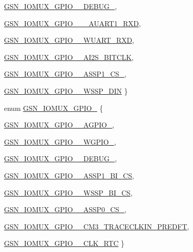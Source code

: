 \begin{DoxyCompactItemize}
\hyperlink{a00519_ad2c6d559f4b898b37fd1858edd2febb1a662e4efe97d2d17301dbd62a2b5828d6}{GSN\_\-IOMUX\_\-GPIO\_\_\-DEBUG\_}, 
\par
\hyperlink{a00519_ad2c6d559f4b898b37fd1858edd2febb1a47ed70f16651dbe92ea2860ed9e83538}{GSN\_\-IOMUX\_\-GPIO\_\_\-\_\-AUART1\_\-RXD}, 
\par
\hyperlink{a00519_ad2c6d559f4b898b37fd1858edd2febb1a3131f1ce489ad39f7f397ce142ac5f38}{GSN\_\-IOMUX\_\-GPIO\_\_\-WUART\_\-RXD}, 
\par
\hyperlink{a00519_ad2c6d559f4b898b37fd1858edd2febb1abf6c2783119d5dbd1d918771b6870e03}{GSN\_\-IOMUX\_\-GPIO\_\_\-AI2S\_\-BITCLK}, 
\par
\hyperlink{a00519_ad2c6d559f4b898b37fd1858edd2febb1a614dcd9e1873dc516b9b08c586d8a38a}{GSN\_\-IOMUX\_\-GPIO\_\_\-ASSP1\_\-CS\_}, 
\par
\hyperlink{a00519_ad2c6d559f4b898b37fd1858edd2febb1aa258ba6ed4ddc5a8c10b4a75ea5db2b4}{GSN\_\-IOMUX\_\-GPIO\_\_\-WSSP\_\-DIN}
 \}
\item 
enum \hyperlink{a00519_ae5090c2bf0f08a5bb6f0fac6e00d8bd5}{GSN\_\-IOMUX\_\-GPIO\_} \{ \par
\hyperlink{a00519_ae5090c2bf0f08a5bb6f0fac6e00d8bd5ad1957e646defd0ced5e1c05a8237af5c}{GSN\_\-IOMUX\_\-GPIO\_\_\-AGPIO\_}, 
\par
\hyperlink{a00519_ae5090c2bf0f08a5bb6f0fac6e00d8bd5ab70e46e1363ff1f2799372659ec9362f}{GSN\_\-IOMUX\_\-GPIO\_\_\-WGPIO\_}, 
\par
\hyperlink{a00519_ae5090c2bf0f08a5bb6f0fac6e00d8bd5a6a108b187882d2056d01648e9400ecb3}{GSN\_\-IOMUX\_\-GPIO\_\_\-DEBUG\_}, 
\par
\hyperlink{a00519_ae5090c2bf0f08a5bb6f0fac6e00d8bd5ac299345854bb28a39a0423a48eccda8f}{GSN\_\-IOMUX\_\-GPIO\_\_\-ASSP1\_\-BI\_\-CS}, 
\par
\hyperlink{a00519_ae5090c2bf0f08a5bb6f0fac6e00d8bd5af339800b70bdeea318519fa16cde35d5}{GSN\_\-IOMUX\_\-GPIO\_\_\-WSSP\_\-BI\_\-CS}, 
\par
\hyperlink{a00519_ae5090c2bf0f08a5bb6f0fac6e00d8bd5aac3aa2e943bfaecd04eb869d20655a6c}{GSN\_\-IOMUX\_\-GPIO\_\_\-ASSP0\_\-CS\_}, 
\par
\hyperlink{a00519_ae5090c2bf0f08a5bb6f0fac6e00d8bd5a40b4a65653c1c1645dc90b6ac88d5470}{GSN\_\-IOMUX\_\-GPIO\_\_\-CM3\_\-TRACECLKIN\_\-PREDFT}, 
\par
\hyperlink{a00519_ae5090c2bf0f08a5bb6f0fac6e00d8bd5a9b62b8c04b3cc20897b9149470e9d2d8}{GSN\_\-IOMUX\_\-GPIO\_\_\-CLK\_\-RTC}
 \}
\item 

\end{DoxyCompactItemize}
